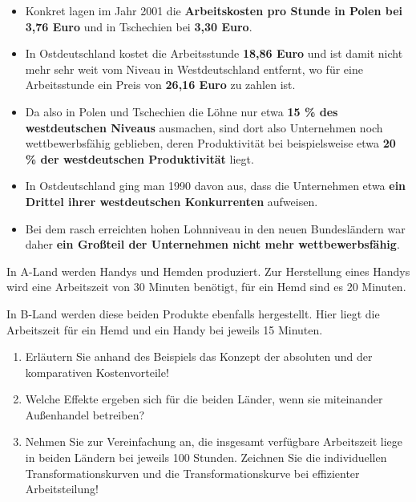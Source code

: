 {\begin{itemize}
    \item Konkret lagen im Jahr 2001 die \textbf{Arbeitskosten pro Stunde in Polen bei 3,76 Euro} und in Tschechien bei \textbf{3,30 Euro}.
    \item In Ostdeutschland kostet die Arbeitsstunde \textbf{18,86 Euro} und ist damit nicht mehr sehr weit vom Niveau in Westdeutschland entfernt, wo für eine Arbeitsstunde ein Preis von \textbf{26,16 Euro} zu zahlen ist.
    \item Da also in Polen und Tschechien die Löhne nur etwa \textbf{15 \% des westdeutschen Niveaus} ausmachen, sind dort also Unternehmen noch wettbewerbsfähig geblieben, deren Produktivität bei beispielsweise etwa \textbf{20 \% der westdeutschen Produktivität} liegt.
    \item In Ostdeutschland ging man 1990 davon aus, dass die Unternehmen etwa \textbf{ein Drittel ihrer westdeutschen Konkurrenten} aufweisen.
    \item Bei dem rasch erreichten hohen Lohnniveau in den neuen Bundesländern war daher \textbf{ein Großteil der Unternehmen nicht mehr wettbewerbsfähig}.
\end{itemize}
}
In A-Land werden Handys und Hemden produziert. Zur Herstellung eines Handys wird eine Arbeitszeit von 30 Minuten benötigt, für ein Hemd sind es 20 Minuten.

In B-Land werden diese beiden Produkte ebenfalls hergestellt. Hier liegt die Arbeitszeit für ein Hemd und ein Handy bei jeweils 15 Minuten.

\begin{enumerate}[label=(\alph*)]
    \item Erläutern Sie anhand des Beispiels das Konzept der absoluten und der komparativen Kostenvorteile!
    \item Welche Effekte ergeben sich für die beiden Länder, wenn sie miteinander Außenhandel betreiben?
    \item Nehmen Sie zur Vereinfachung an, die insgesamt verfügbare Arbeitszeit liege in beiden Ländern bei jeweils 100 Stunden. Zeichnen Sie die individuellen Transformationskurven und die Transformationskurve bei effizienter Arbeitsteilung!
\end{enumerate}

